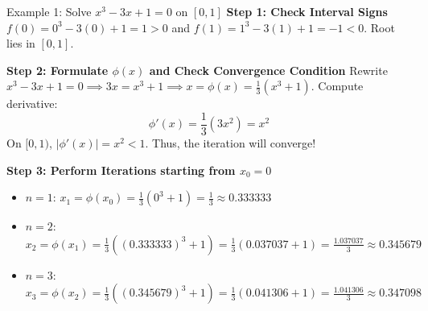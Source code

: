 \documentclass[11pt,a4paper]{article}
\begin{document}
\begin{exbox}{Example 1: Solve $x^3 - 3x + 1 = 0$ on $[0, 1]$}
\textbf{Step 1: Check Interval Signs}
$f(0) = 0^3 - 3(0) + 1 = 1 > 0$ and $f(1) = 1^3 - 3(1) + 1 = -1 < 0$. Root lies in $[0, 1]$.

\textbf{Step 2: Formulate $\phi(x)$ and Check Convergence Condition}
Rewrite $x^3 - 3x + 1 = 0 \implies 3x = x^3 + 1 \implies x = \phi(x) = \frac{1}{3}(x^3 + 1)$.
Compute derivative:
$$\phi'(x) = \frac{1}{3}(3x^2) = x^2$$
On $[0, 1)$, $|\phi'(x)| = x^2 < 1$. Thus, the iteration will converge!

\textbf{Step 3: Perform Iterations starting from $x_0 = 0$}
\begin{itemize}
    \item $n=1$: $x_1 = \phi(x_0) = \frac{1}{3}(0^3 + 1) = \frac{1}{3} \approx \mathbf{0.333333}$
    \item $n=2$: $x_2 = \phi(x_1) = \frac{1}{3}((0.333333)^3 + 1) = \frac{1}{3}(0.037037 + 1) = \frac{1.037037}{3} \approx \mathbf{0.345679}$
    \item $n=3$: $x_3 = \phi(x_2) = \frac{1}{3}((0.345679)^3 + 1) = \frac{1}{3}(0.041306 + 1) = \frac{1.041306}{3} \approx \mathbf{0.347098}$
\end{itemize}
\end{exbox}
\end{document}
